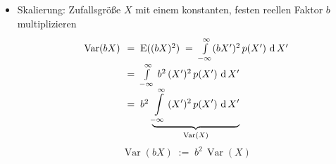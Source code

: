 \begin{itemize}
\item Skalierung:
Zufallsgröße $X$ mit einem konstanten, festen reellen Faktor $b$ multiplizieren
\begin{equation}
\arraycolsep=3.5pt\def\arraystretch{1.8}
\begin{array}{ll}
\operatorname {Var}(b X) & = \; \operatorname{E}((b X)^2) \; = \;
 \int\limits_{-\infty}^{\infty}
 (b X^\prime)^2 \, p(X^\prime) \, \operatorname{d} X^\prime\\
 & =\;  \int\limits_{-\infty}^{\infty} \, b^2 \,
 (X^\prime)^2 \, p(X^\prime) \, \operatorname{d} X^\prime\\
 & =\;  b^2 \, \underbrace{\int\limits_{-\infty}^{\infty} \,
 (X^\prime)^2 \, p(X^\prime) \, \operatorname{d} X^\prime}_{\operatorname {Var}(X)}
\end{array}
\label{eq:skalierungvarianzherl}
\end{equation}
\begin{equation}
\operatorname {Var}(b X) \; := \; b^2 \, \operatorname {Var}(X)
\label{eq:skalierungvarianz}
\end{equation}
\end{itemize}


